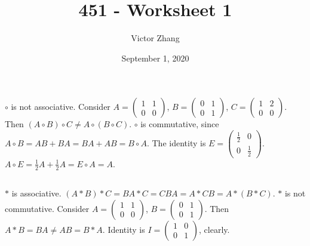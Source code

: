 \documentclass{article}
\title{451 - Worksheet 1}
\author{Victor Zhang}
\date{September 1, 2020}
\begin{document}
\maketitle

\section{}
\subsection{}
$\circ$ is not associative. Consider $A = \left( \begin{matrix} 1 & 1 \\ 0 & 0 \end{matrix} \right)$, $B = \left( \begin{matrix} 0 & 1 \\ 0 & 1 \end{matrix} \right)$, $C = \left( \begin{matrix} 1 & 2 \\ 0 & 0 \end{matrix} \right)$. Then $(A\circ B) \circ C \neq A\circ (B \circ C)$. $\circ$ is commutative, since $A \circ B = AB+BA = BA+AB = B \circ A$. The identity is $E = \left( \begin{matrix} \frac{1}{2} & 0 \\ 0 & \frac{1}{2} \end{matrix} \right)$. $A \circ E = \frac{1}{2}A + \frac{1}{2}A = E \circ A = A$.

\subsection{}
$*$ is associative. $(A*B)*C = BA*C = CBA = A*CB = A*(B*C)$. $*$ is not commutative. Consider $A = \left( \begin{matrix} 1 & 1 \\ 0 & 0 \end{matrix} \right)$, $B = \left( \begin{matrix} 0 & 1 \\ 0 & 1 \end{matrix} \right)$. Then $A*B = BA \neq AB = B*A$. Identity is $I = \left( \begin{matrix} 1 & 0 \\ 0 & 1 \end{matrix} \right)$, clearly.
\end{document}

